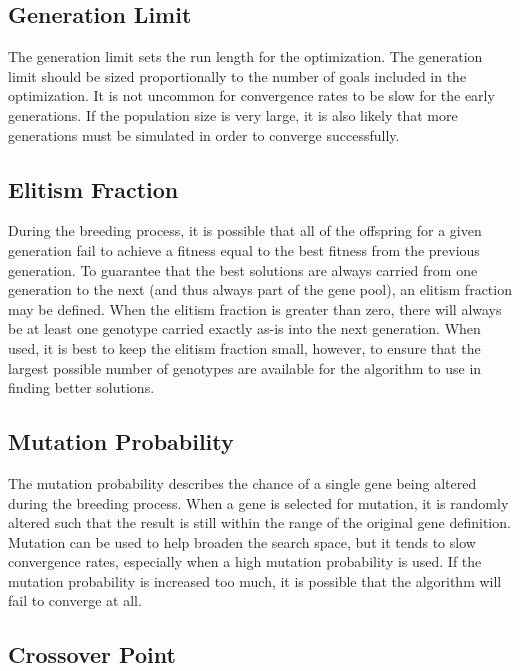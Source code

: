 \subsection{Generation Limit} \label{ssec:generationLimit}

The generation limit sets the run length for the optimization.  The generation limit should be sized proportionally to the number of goals included in the optimization.  It is not uncommon for convergence rates to be slow for the early generations.  If the population size is very large, it is also likely that more generations must be simulated in order to converge successfully.

\subsection{Elitism Fraction} \label{ssec:elitismFraction}

During the breeding process, it is possible that all of the offspring for a given generation fail to achieve a fitness equal to the best fitness from the previous generation.  To guarantee that the best solutions are always carried from one generation to the next (and thus always part of the gene pool), an elitism fraction may be defined.  When the elitism fraction is greater than zero, there will always be at least one genotype carried exactly as-is into the next generation.  When used, it is best to keep the elitism fraction small, however, to ensure that the largest possible number of genotypes are available for the algorithm to use in finding better solutions.

\subsection{Mutation Probability} \label{ssec:mutationProbability}

The mutation probability describes the chance of a single gene being altered during the breeding process.  When a gene is selected for mutation, it is randomly altered such that the result is still within the range of the original gene definition.  Mutation can be used to help broaden the search space, but it tends to slow convergence rates, especially when a high mutation probability is used.  If the mutation probability is increased too much, it is possible that the algorithm will fail to converge at all.

\subsection{Crossover Point} \label{ssec:crossoverPoint}

